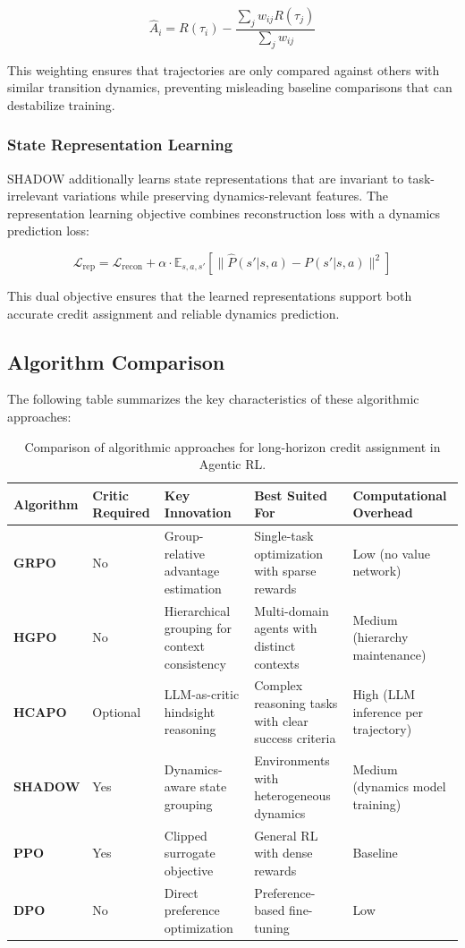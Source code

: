 $$\hat{A}_i = R(\tau_i) - \frac{\sum_{j} w_{ij} R(\tau_j)}{\sum_{j} w_{ij}}$$

This weighting ensures that trajectories are only compared against others with similar transition dynamics, preventing misleading baseline comparisons that can destabilize training.

\subsubsection{State Representation Learning}

SHADOW additionally learns state representations that are invariant to task-irrelevant variations while preserving dynamics-relevant features. The representation learning objective combines reconstruction loss with a dynamics prediction loss:

$$\mathcal{L}_{\text{rep}} = \mathcal{L}_{\text{recon}} + \alpha \cdot \mathbb{E}_{s,a,s'}\left[\|\hat{P}(s'|s,a) - P(s'|s,a)\|^2\right]$$

This dual objective ensures that the learned representations support both accurate credit assignment and reliable dynamics prediction.

\subsection{Algorithm Comparison}

The following table summarizes the key characteristics of these algorithmic approaches:

\begin{table}[tbp]
\centering
\footnotesize
\begin{tabularx}{\textwidth}{YYYYY}
\toprule
\textbf{Algorithm} & \textbf{Critic Required} & \textbf{Key Innovation} & \textbf{Best Suited For} & \textbf{Computational Overhead} \\
\midrule
\textbf{GRPO} & No & Group-relative advantage estimation & Single-task optimization with sparse rewards & Low (no value network) \\
\textbf{HGPO} & No & Hierarchical grouping for context consistency & Multi-domain agents with distinct contexts & Medium (hierarchy maintenance) \\
\textbf{HCAPO} & Optional & LLM-as-critic hindsight reasoning & Complex reasoning tasks with clear success criteria & High (LLM inference per trajectory) \\
\textbf{SHADOW} & Yes & Dynamics-aware state grouping & Environments with heterogeneous dynamics & Medium (dynamics model training) \\
\textbf{PPO} & Yes & Clipped surrogate objective & General RL with dense rewards & Baseline \\
\textbf{DPO} & No & Direct preference optimization & Preference-based fine-tuning & Low \\
\bottomrule
\end{tabularx}
\caption{Comparison of algorithmic approaches for long-horizon credit assignment in Agentic RL.}
\label{tbl:algorithm-comparison}
\end{table}

